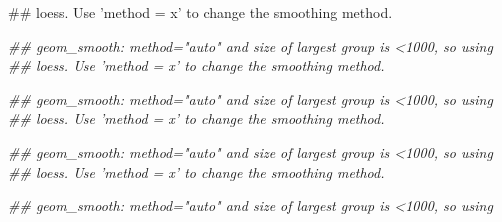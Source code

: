 \documentclass{article}\usepackage{graphicx, color}
\makeatletter
\newenvironment{kframe}{%
 \def\at@end@of@kframe{}%
 \ifinner\ifhmode%
  \def\at@end@of@kframe{\end{minipage}}%
  \begin{minipage}{\columnwidth}%
 \fi\fi%
 \def\FrameCommand##1{\hskip\@totalleftmargin \hskip-\fboxsep
 \colorbox{shadecolor}{##1}\hskip-\fboxsep
     \hskip-\linewidth \hskip-\@totalleftmargin \hskip\columnwidth}%
 \MakeFramed {\advance\hsize-\width
   \@totalleftmargin\z@ \linewidth\hsize
   \@setminipage}}%
 {\par\unskip\endMakeFramed%
 \at@end@of@kframe}
\newenvironment{knitrout}{}{} %
\makeatother
\begin{document}
\begin{knitrout}
\begin{kframe}
\begin{flushleft}
{\#\# loess. Use 'method = x' to change the smoothing method.}\end{flushleft}\begin{flushleft}\ttfamily\noindent\itshape\textcolor{messagecolor}{\#\# geom\_smooth: method="auto" and size of largest group is <1000, so using \\ 
\#\# loess. Use 'method = x' to change the smoothing method.}\end{flushleft}\begin{flushleft}\ttfamily\noindent\itshape\textcolor{messagecolor}{\#\# geom\_smooth: method="auto" and size of largest group is <1000, so using \\ 
\#\# loess. Use 'method = x' to change the smoothing method.}\end{flushleft}\begin{flushleft}\ttfamily\noindent\itshape\textcolor{messagecolor}{\#\# geom\_smooth: method="auto" and size of largest group is <1000, so using \\ 
\#\# loess. Use 'method = x' to change the smoothing method.}\end{flushleft}\begin{flushleft}\ttfamily\noindent\itshape\textcolor{messagecolor}{\#\# geom\_smooth: method="auto" and size of largest group is <1000, so using \\ 
}
\end{flushleft}
\end{kframe}
\end{knitrout}
\end{document}
